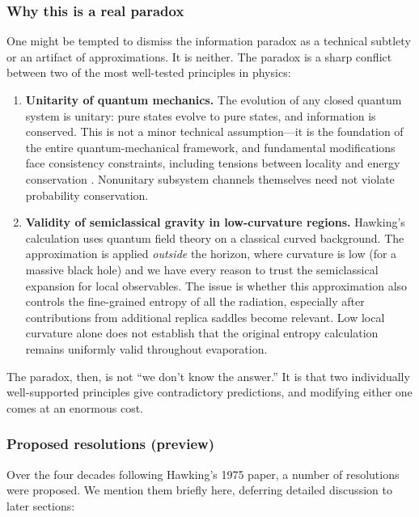 \documentclass[11pt,letterpaper]{article}
\theoremstyle{plain}
\theoremstyle{definition}
\theoremstyle{remark}
\begin{document}
\subsubsection*{Why this is a real paradox}

One might be tempted to dismiss the information paradox as a technical
subtlety or an artifact of approximations.  It is neither.  The paradox
is a sharp conflict between two of the most well-tested principles in
physics:

\begin{enumerate}[label=(\roman*)]
  \item \textbf{Unitarity of quantum mechanics.}  The evolution of any
  closed quantum system is unitary: pure states evolve to pure states,
  and information is conserved.  This is not a minor technical
  assumption---it is the foundation of the entire quantum-mechanical
  framework, and fundamental modifications face consistency constraints, including
  tensions between locality and energy conservation \cite{banks1984}.
  Nonunitary subsystem channels themselves need not violate probability
  conservation.

  \item \textbf{Validity of semiclassical gravity in low-curvature
  regions.}  Hawking's calculation uses quantum field theory on a
  classical curved background.  The approximation is applied
  \emph{outside} the horizon, where curvature is low (for a massive
  black hole) and we have every reason to trust the semiclassical
  expansion for local observables. The issue is whether this approximation
  also controls the fine-grained entropy of all the radiation, especially
  after contributions from additional replica saddles become relevant.
  Low local curvature alone does not establish that the original entropy
  calculation remains uniformly valid throughout evaporation.
\end{enumerate}

The paradox, then, is not ``we don't know the answer.''  It is that
two individually well-supported principles give contradictory
predictions, and modifying either one comes at an enormous cost.

\subsubsection*{Proposed resolutions (preview)}

Over the four decades following Hawking's 1975 paper, a number of
resolutions were proposed.  We mention them briefly here, deferring
detailed discussion to later sections:
\end{document}
